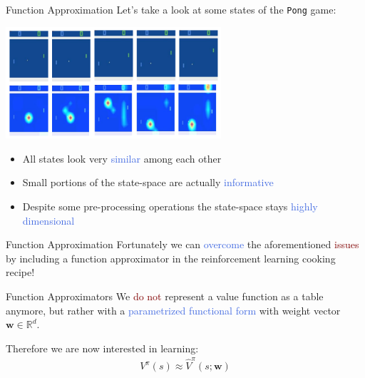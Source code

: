 \documentclass{beamer}
\begin{document}
\begin{frame}{Function Approximation}
	Let's take a look at some states of the \texttt{Pong} game:
	\begin{center}
		\includegraphics[width=8cm]{./Images/pong}
	\end{center}


	\begin{itemize}
		\item All states look very \textcolor{RoyalBlue}{similar} among each other
		\item Small portions of the state-space are actually \textcolor{RoyalBlue}{informative}
		\item Despite some pre-processing operations the state-space stays \textcolor{RoyalBlue}{highly dimensional}
	\end{itemize}

\end{frame}


\begin{frame}{Function Approximation}
	Fortunately we can \textcolor{RoyalBlue}{overcome} the aforementioned \textcolor{Maroon}{issues} by including a function approximator in the reinforcement learning cooking recipe!
	\begin{block}{Function Approximators}
		We \textcolor{Maroon}{do not} represent a value function as a table anymore, but rather with a \textcolor{RoyalBlue}{parametrized functional form} with weight vector $\mathbf{w}\in\mathds{R}^{d}$.


		Therefore we are now interested in learning:
		\begin{align*}
			V^{\pi}(s) \approx \hat{V}^{\pi}(s;\mathbf{w})
		\end{align*}
	\end{block}

\end{frame}
\end{document}
